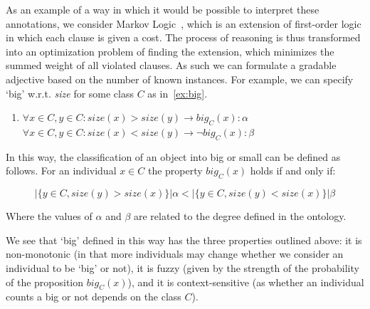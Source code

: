 \documentclass[11pt]{article}
\begin{document}
As an example of a way in which it would be possible to interpret these 
annotations, we consider Markov Logic~\cite{richardson2006markov}, which is an 
extension of first-order logic in which each clause is given a cost. The process 
of reasoning is thus transformed into an optimization problem of finding the 
extension, which minimizes the summed weight of all violated clauses. As such we
can formulate a gradable adjective based on the number of known instances. 
For example, we can specify `big' w.r.t. \emph{size} for some class $C$ as in~\ref{ex:big}.
%
\begin{enumerate}[resume]
\item $\forall x \in C, y \in C : size(x) > size(y) \rightarrow big_C(x) : \alpha$ \\
$\forall x \in C, y \in C : size(x) < size(y) \rightarrow \neg big_C(x) : \beta$
\label{ex:big}
\end{enumerate}
%
In this way, the classification of an object into big or small can be defined as follows.
For an individual $x \in C$ the property $big_C(x)$ holds if and only if: 

$$|\{y \in C, size(y) > size(x)\}| \alpha < |\{y \in C, size(y) < size(x)\}| \beta$$

Where the values of $\alpha$ and $\beta$ are related to the degree defined
in the ontology.

We see that `big' defined in this way has the three properties outlined above: 
it is non-monotonic (in that more individuals may change whether we consider an individual 
to be `big' or not), it is fuzzy (given by the strength of the probability of the proposition $big_C(x)$), 
and it is context-sensitive (as whether an individual counts a big or not depends on the class $C$).
\end{document}
